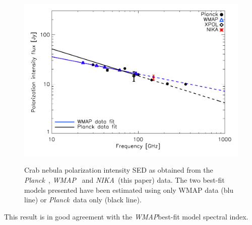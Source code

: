 \documentclass[twocolumn,traditabstract]{aa}
\def\NIKA{\textit{NIKA}}
\def\Planck{\textit{Planck}}
\def\WMAP{\textit{WMAP}}
\begin{document}
\begin{figure}
  \centering
             { \includegraphics[width=1\linewidth,keepaspectratio]{figures/Crab_SED_ipol.pdf}}
           \caption{Crab nebula polarization intensity SED as obtained from the \Planck\ \citep{2015arXiv150702058P}, \WMAP\ \citep{2011ApJS..192...19W} and \NIKA\ (this paper) data. The two best-fit models presented have been estimated using only WMAP data (blu line) or \Planck\ data only (black line).}
\label{crab_SED_ipol}		
  \end{figure} 
 \noindent
This result is in good agreement with the \WMAP best-fit model spectral index.


\end{document}
